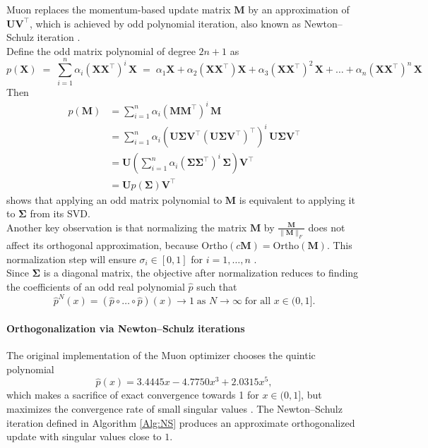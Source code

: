 Muon replaces the momentum-based update matrix $\mathbf{M}$ by an approximation of $\mathbf{U} \mathbf{V}^\top$, which is achieved by odd polynomial iteration, also known as Newton--Schulz iteration \cite{jordan2024muon}. \\
Define the odd matrix polynomial of degree $2n + 1$ as
\[
    p(\mathbf{X}) \;= \;  \sum_{i=1}^{n} \alpha_i (\mathbf{X}\mathbf{X}^\top)^i \,\mathbf{X} \;= \; \alpha_1 \mathbf{X} +\alpha_2 (\mathbf{X} \mathbf{X}^\top)\mathbf{X} + \alpha_3 (\mathbf{X} \mathbf{X}^\top)^2 \, \mathbf{X} + \ldots + \alpha_n (\mathbf{XX}^\top)^n\,\mathbf{X} 
\]
Then
\[
\begin{aligned}
    p(\mathbf{M}) & = \sum_{i=1}^{n} \alpha_i (\mathbf{M} \mathbf{M}^\top)^i\, \mathbf{M}  \\
    & = \sum_{i=1}^{n} \alpha_i (\mathbf{U} \mathbf{\Sigma} \mathbf{V}^\top (\mathbf{U} \mathbf{\Sigma} \mathbf{V}^\top)^\top)^i \,\mathbf{U} \mathbf{\Sigma} \mathbf{V}^\top \\
    & = \mathbf{U} \left(\sum_{i=1}^n \alpha_i (\mathbf{\Sigma} \mathbf{\Sigma^\top})^i \, \mathbf{\Sigma} \right) \mathbf{V}^\top \\
    & = \mathbf{U} p(\mathbf{\Sigma}) \mathbf{V}^\top
\end{aligned}
\]
shows that applying an odd matrix polynomial to $\mathbf{M}$ is equivalent to applying it to $\mathbf{\Sigma}$ from its SVD. \\
Another key observation is that normalizing the matrix $\mathbf{M}$ by $\frac{\mathbf{M}}{\|\mathbf{M}\|_F}$ does not affect its orthogonal approximation, because $\mathrm{Ortho}(c\mathbf{M}) = \mathrm{Ortho}(\mathbf{M})$. This normalization step will ensure $\sigma_i \in [0, 1]$ for $i=1,\ldots,n$ \cite{jordan2024muon}. \\
Since $\mathbf{\Sigma}$ is a diagonal matrix, the objective after normalization reduces to finding the coefficients of an odd real polynomial $\hat{p}$ such that 
\[
    \hat{p}^N (x) = (\hat{p} \circ \ldots\circ \hat{p} )(x) \to 1 \; \text{as } N \to \infty \; \text{for all } x\in (0, 1].
\]

\paragraph*{Orthogonalization via Newton--Schulz iterations}
The original implementation of the Muon optimizer chooses the quintic polynomial 
\[
    \hat{p}(x) = 3.4445 x - 4.7750x^3 + 2.0315 x^5,
\]
which makes a sacrifice of exact convergence towards 1 for $x \in (0,1]$, but maximizes the convergence rate of small singular values \cite{jordan2024muon}.
The Newton--Schulz iteration defined in Algorithm \ref{Alg:NS} produces an approximate orthogonalized update with singular values close to $1$.

